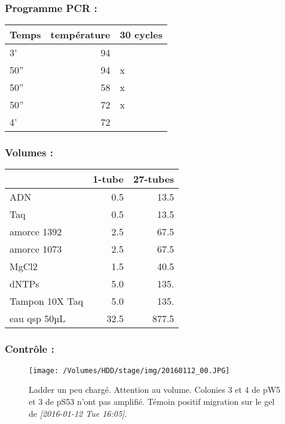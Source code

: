 \documentclass[9pt, oneside, twocolumn]{scrartcl}
\begin{document}
\subsubsection{Programme PCR :}
\label{sec:orgheadline7}
\begin{center}
\begin{tabular}{lrl}
\toprule
Temps & température & 30 cycles\\
\midrule
3' & 94 & \\
50'' & 94 & x\\
50'' & 58 & x\\
50'' & 72 & x\\
4' & 72 & \\
\bottomrule
\end{tabular}
\end{center}

\subsubsection{Volumes :}
\label{sec:orgheadline8}
\begin{center}
\begin{tabular}{lrr}
\toprule
 & 1-tube & 27-tubes\\
\midrule
ADN & 0.5 & 13.5\\
Taq & 0.5 & 13.5\\
amorce 1392 & 2.5 & 67.5\\
amorce 1073 & 2.5 & 67.5\\
MgCl2 & 1.5 & 40.5\\
dNTPs & 5.0 & 135.\\
Tampon 10X Taq & 5.0 & 135.\\
\midrule
eau qsp 50µL & 32.5 & 877.5\\
\bottomrule
\end{tabular}
\end{center}

\subsubsection{Contrôle :}
\label{sec:orgheadline9}

\begin{figure}[htb]
\centering
\texttt{[image: /Volumes/HDD/stage/img/20160112\_00.JPG]}
\caption{Ladder un peu chargé. Attention au volume. Colonies 3 et 4 de pW5 et 3 de pS53 n'ont pas amplifié. Témoin positif migration sur le gel de \textit{[2016-01-12 Tue 16:05]}.}
\end{figure}
\end{document}
